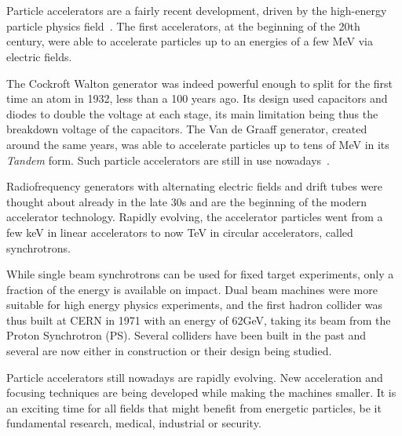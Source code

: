 \section{}


Particle accelerators are a fairly recent development, driven by the high-energy particle
physics field~\cite{bryant_brief_1994}. The first accelerators, at the beginning of the 20th
century, were able to accelerate particles up to an energies of a few MeV via electric fields.

The Cockroft Walton generator was indeed powerful enough to split for the first time an atom in
1932, less than a 100 years ago. Its design used capacitors and diodes to double the voltage at each
stage, its main limitation being thus the breakdown voltage of the capacitors.
The Van de Graaff generator, created around the same years, was able to accelerate particles up to
tens of MeV in its \textit{Tandem} form. Such particle accelerators are still in use
nowadays~\cite{lebois_rapport_2020}.

Radiofrequency generators with alternating electric fields and drift tubes were thought about
already in the late 30s and are the beginning of the modern accelerator technology.
Rapidly evolving, the accelerator particles went from a few keV in linear accelerators to now TeV in 
circular accelerators, called synchrotrons.

While single beam synchrotrons can be used for fixed target experiments, only a fraction of the
energy is available on impact. Dual beam machines were more suitable for high energy physics
experiments, and the first hadron collider was thus built at CERN in 1971 with an energy of 62GeV,
taking its beam from the Proton Synchrotron (PS). Several colliders have been built in the past and
several are now either in construction or their design being studied.

Particle accelerators still nowadays are rapidly evolving. New acceleration and focusing techniques
are being developed while making the machines smaller. It is an exciting time for all fields that
might benefit from energetic particles, be it fundamental research, medical, industrial or security.



